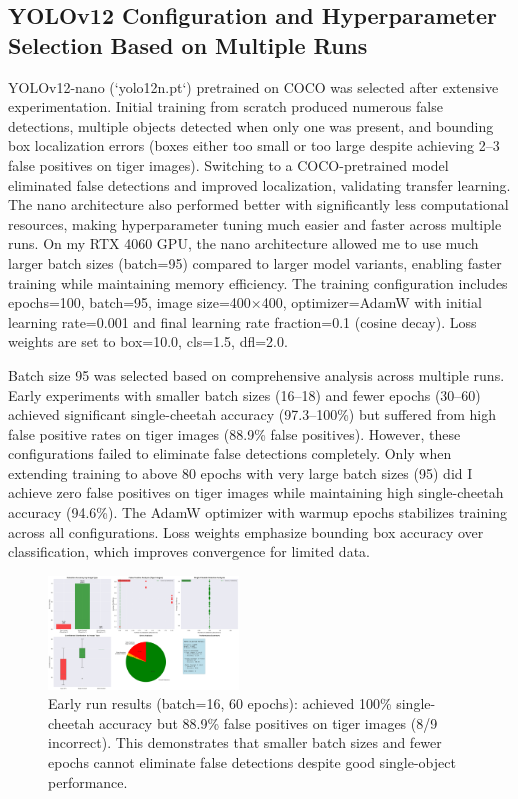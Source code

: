 \documentclass[conference]{IEEEtran}
\begin{document}
\subsection{YOLOv12 Configuration and Hyperparameter Selection Based on Multiple Runs}

YOLOv12-nano (`yolo12n.pt`) pretrained on COCO was selected after extensive experimentation. Initial training from scratch produced numerous false detections, multiple objects detected when only one was present, and bounding box localization errors (boxes either too small or too large despite achieving 2–3 false positives on tiger images). Switching to a COCO-pretrained model eliminated false detections and improved localization, validating transfer learning. The nano architecture also performed better with significantly less computational resources, making hyperparameter tuning much easier and faster across multiple runs. On my RTX 4060 GPU, the nano architecture allowed me to use much larger batch sizes (batch=95) compared to larger model variants, enabling faster training while maintaining memory efficiency. The training configuration includes epochs=100, batch=95, image size=400×400, optimizer=AdamW with initial learning rate=0.001 and final learning rate fraction=0.1 (cosine decay). Loss weights are set to box=10.0, cls=1.5, dfl=2.0.

Batch size 95 was selected based on comprehensive analysis across multiple runs. Early experiments with smaller batch sizes (16–18) and fewer epochs (30–60) achieved significant single-cheetah accuracy (97.3–100\%) but suffered from high false positive rates on tiger images (88.9\% false positives). However, these configurations failed to eliminate false detections completely. Only when extending training to above 80 epochs with very large batch sizes (95) did I achieve zero false positives on tiger images while maintaining high single-cheetah accuracy (94.6\%). The AdamW optimizer with warmup epochs stabilizes training across all configurations. Loss weights emphasize bounding box accuracy over classification, which improves convergence for limited data.

\begin{figure}[htbp]
\centerline{\includegraphics[width=0.45\textwidth]{enhanced_validation_batch16.png}}
\caption{Early run results (batch=16, 60 epochs): achieved 100\% single-cheetah accuracy but 88.9\% false positives on tiger images (8/9 incorrect). This demonstrates that smaller batch sizes and fewer epochs cannot eliminate false detections despite good single-object performance.}
\label{fig:batch16_results}
\end{figure}
\end{document}
